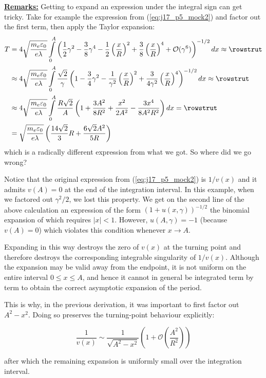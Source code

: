 \textbf{\underline{Remarks:}} Getting to expand an expression under the integral sign can get tricky. Take for example the expression from (\ref{eq:j17_p5_mock2}) and factor out the first term, then apply the Taylor expansion:
	\begin{equation*}
		\begin{aligned}
			T 
			&= 
			4 \sqrt{\frac{m_e \varepsilon_0}{e \lambda}}
			\int\limits_{0}^{A}
			\left(
			\frac{1}{2} \gamma^2 - \frac{3}{8} \gamma^4 - \frac{1}{2} \left(\frac{x}{R}\right)^2
			+
			\frac{3}{8} \left(\frac{x}{R}\right)^4
			+
			\mathcal{O}(\gamma^6)
			\right)^{-1/2}
			dx
			\approx
			\rowstrut
			\\
			&\approx
			4 \sqrt{\frac{m_e \varepsilon_0}{e \lambda}}
			\int\limits_{0}^{A}
			\frac{\sqrt{2}}{\gamma}
			\left(
			1 - \frac{3}{4} \gamma^2 
			-
			\frac{1}{\gamma^2} \left(\frac{x}{R}\right)^2 
			+
			\frac{3}{4\gamma^2} \left(\frac{x}{R}\right)^4
			\right)^{-1/2} dx
			\approx
			\rowstrut
			\\
			&\approx
			4 \sqrt{\frac{m_e \varepsilon_0}{e \lambda}}
			\int\limits_{0}^{A}
			\frac{R \sqrt{2}}{A}
			\left(
			1 + \frac{3A^2}{8R^2} + \frac{x^2}{2A^2}
			-
			\frac{3x^4}{8A^2 R^2}
			\right)
			dx =
			\rowstrut
			\\
			&= 
			\sqrt{\frac{m_e \varepsilon_0}{e \lambda}}
			\left(
			\frac{14 \sqrt{2}}{3} R + \frac{6 \sqrt{2} A^2}{5R}
			\right)
		\end{aligned}
\end{equation*}
which is a radically different expression from what we got. So where did we go wrong?

Notice that the original expression from (\ref{eq:j17_p5_mock2}) is $1 / v(x)$ and it admits $v(A) = 0$ at the end of the integration interval. In this example, when we factored out $\gamma^2 / 2$, we lost this property. We get on the second line of the above calculation an expression of the form $(1 + u(x, \gamma))^{-1/2}$ the binomial expansion of which requires $|x| < 1$. However, $u(A, \gamma) = -1$ (because $v(A) = 0$) which violates this condition whenever $x \rightarrow A$. 

Expanding in this way destroys the zero of \(v(x)\) at the turning point and therefore destroys the corresponding integrable singularity of \(1/v(x)\). Although the expansion may be valid away from the endpoint, it is not uniform on the entire interval \(0\le x\le A\), and hence it cannot in general be integrated term by term to obtain the correct asymptotic expansion of the period.

This is why, in the previous derivation, it was important to first factor out \(A^2-x^2\). Doing so preserves the turning-point behaviour explicitly:

\begin{equation*}
	\frac{1}{v(x)}
	\sim
	\frac{1}{\sqrt{A^2-x^2}}
	\left(1+\mathcal{O}\!\left(\frac{A^2}{R^2}\right)\right)
\end{equation*}

after which the remaining expansion is uniformly small over the integration interval.

